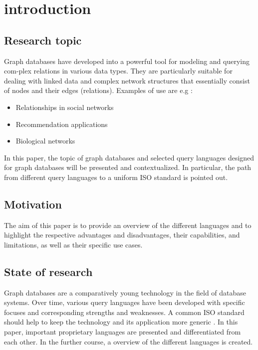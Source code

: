\chapter{introduction}
\label{ch:intro}

\section{Research topic}
\label{sec:intro:Forschungsthema}
Graph databases have developed into a powerful tool for modeling and querying com-plex relations in various data types. 
They are particularly suitable for dealing with linked data and complex network structures that essentially consist of nodes and their edges (relations). 
Examples of use are e.g \citep{yuanyuan_tian_world_2022}:
\begin{itemize}
	\item Relationships in social networks
	\item Recommendation applications
	\item Biological networks
\end{itemize}
In this paper, the topic of graph databases and selected query languages designed for graph databases will be presented and contextualized. 
In particular, the path from different query languages to a uniform ISO standard is pointed out.


\section{Motivation}
\label{sec:intro:Motivation}
The aim of this paper is to provide an overview of the different languages and to highlight the respective advantages and disadvantages, 
their capabilities, and limitations, as well as their specific use cases. 

\section{State of research}
\label{sec:intro:State of researc}
Graph databases are a comparatively young technology in the field of database systems. 
Over time, various query languages have been developed with specific focuses and corresponding strengths and weaknesses.
A common ISO standard should help to keep the technology and its application more generic \citep{hare_isoiec_2024}.
In this paper, important proprietary languages are presented and differentiated from each other. 
In the further course, a overview of the different languages is created.

